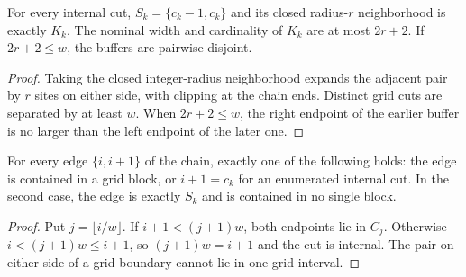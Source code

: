 \begin{lemma}
    \label{thm:huang_chain_grid_buffers}
    \leanok
    For every internal cut, $S_k=\{c_k-1,c_k\}$ and its closed radius-$r$
    neighborhood is exactly $K_k$. The nominal width and cardinality of $K_k$
    are at most $2r+2$. If $2r+2\le w$, the buffers are pairwise disjoint.
\end{lemma}
\begin{proof}
    \leanok
    Taking the closed integer-radius neighborhood expands the adjacent pair
    by $r$ sites on either side, with clipping at the chain ends. Distinct
    grid cuts are separated by at least $w$. When $2r+2\le w$, the right
    endpoint of the earlier buffer is no larger than the left endpoint of
    the later one.
\end{proof}

\begin{lemma}
    \label{thm:huang_chain_grid_edges}
    \leanok
    For every edge $\{i,i+1\}$ of the chain, exactly one of the following holds:
    the edge is contained in a grid block, or $i+1=c_k$ for an enumerated
    internal cut. In the second case, the edge is exactly $S_k$ and is
    contained in no single block.
\end{lemma}
\begin{proof}
    \leanok
    Put $j=\lfloor i/w\rfloor$. If $i+1<(j+1)w$, both endpoints lie in $C_j$.
    Otherwise $i<(j+1)w\le i+1$, so $(j+1)w=i+1$ and the cut is internal.
    The pair on either side of a grid boundary cannot lie in one grid interval.
\end{proof}
